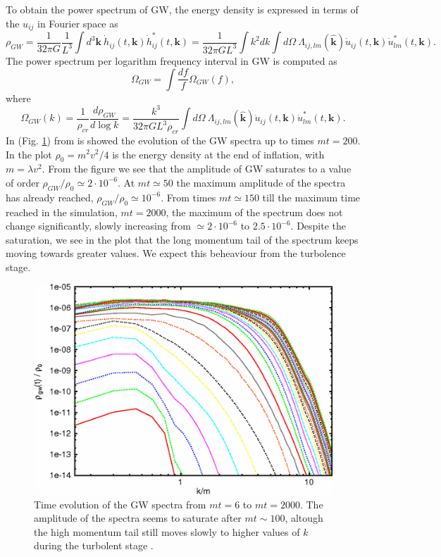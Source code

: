 \documentclass[11pt,a4paper,twoside]{book}
\begin{document}
To obtain the power spectrum of GW, the energy density is expressed in terms of the  $u_{ij}  $ in Fourier space as
\begin{equation}
\label{Chap7:HybridModels_EnergyDensity}
\rho_{GW}=\frac{1}{32\pi G}\frac{1}{L^{3}}\int d^{3}\textbf{k}\ \dot{h}_{ij}(t,\textbf{k})\dot{h}^{*}_{ij}(t,\textbf{k})
=\frac{1}{32\pi G L^{3}}  \int k^{2}dk \int d\Omega\  \Lambda_{ij,lm}(\hat{\textbf{k}}) \dot{u}_{ij}(t,\textbf{k}) \dot{u}_{lm}^{*}(t,\textbf{k}).
\end{equation} 
The power spectrum per logarithm frequency interval in GW is computed as 
\begin{equation}
\Omega_{GW}=\int \frac{df}{f}\Omega_{GW}(f),
\end{equation}
where 
\begin{equation}
\Omega_{GW}(k) = \frac{1}{\rho_{cr}}\frac{d\rho_{GW}}{d \log k}= \frac{k^{3}}{32\pi GL^{3}\rho_{cr}}\int d\Omega\  \Lambda_{ij,lm}(\hat{\textbf{k}})\dot{u}_{ij}(t,\textbf{k}) \dot{u}_{lm}^{*}(t,\textbf{k}).
\end{equation}
In (Fig. \ref{fig:hybridfig9}) from \cite{Chap7:HybridModel} is showed the evolution of the GW spectra up to times $ mt=200 $. In the plot $ \rho_{0}=m^{2}v^{2}/4 $ is the energy density at the end of inflation, with $ m=\lambda v^{2} $. From the figure we see that the amplitude of GW saturates to a value of order $ \rho_{GW}/\rho_{0} \simeq 2 \cdot 10^{-6} $. At $ mt \simeq 50 $ the maximum amplitude of the spectra has already reached, $ \rho_{GW}/\rho_{0} \simeq 10^{-6} $. From times $ mt\simeq 150 $ till the maximum time reached in the simulation, $ mt=2000 $, the maximum of the spectrum does not change significantly, slowly increasing from $ \simeq 2\cdot 10^{-6} $ to $ 2.5 \cdot 10^{-6} $. Despite the saturation, we see in the plot that the long momentum tail of the spectrum keeps moving towards greater values. We expect this beheaviour from the turbolence stage. 
\begin{figure}
	\centering
	\includegraphics[width=0.65\linewidth, height=0.35\textheight]{Images/Chap7/Hybrid_Fig9}
	\caption{Time evolution of the GW spectra from $ mt=6 $ to $ mt=2000 $. The amplitude of the spectra seems to saturate after $ mt \sim 100 $, altough the high momentum tail still moves slowly to higher values of $ k $ during the turbolent stage \cite{Chap7:HybridModel}.}
	\label{fig:hybridfig9}
\end{figure}
\end{document}
